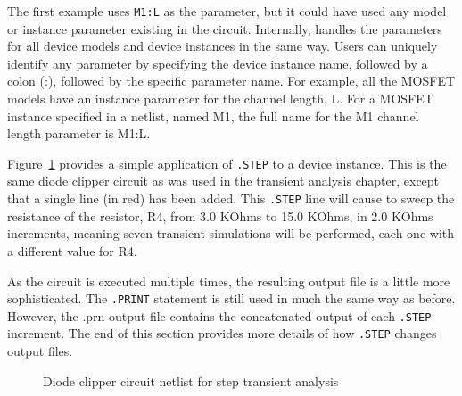 The first example uses \verb|M1:L| as the parameter, but it could have
used any model or instance parameter existing in the
circuit. Internally, \Xyce{} handles the parameters for all device
models and device instances in the same way.  Users can uniquely
identify any parameter by specifying the device instance name,
followed by a colon (:), followed by the specific parameter name.  For
example, all the MOSFET models have an instance parameter for the
channel length, L.  For a MOSFET instance specified in a netlist,
named M1, the full name for the M1 channel length parameter is M1:L.

Figure~\ref{Step_Netlist_1} provides a simple application of
\verb|.STEP| to a device instance.  This is the same diode clipper
circuit as was used in the transient analysis chapter, except that a
single line (in red) has been added.  This \verb|.STEP| line will
cause \Xyce{} to sweep the resistance of the resistor, R4, from 3.0
KOhms to 15.0 KOhms, in 2.0 KOhms increments, meaning seven transient
simulations will be performed, each one with a different value for R4.

As the circuit is executed multiple times, the resulting output file
is a little more sophisticated.  The \verb|.PRINT| statement is still
used in much the same way as before.  However, the .prn output file
contains the concatenated output of each \verb|.STEP| increment.  The
end of this section provides more details of how \texttt{.STEP}
changes output files.

\begin{figure}[htbp]
\begin{centering}
\caption{Diode clipper circuit netlist for step transient
analysis\label{Step_Netlist_1}}
\end{centering}
\end{figure}

